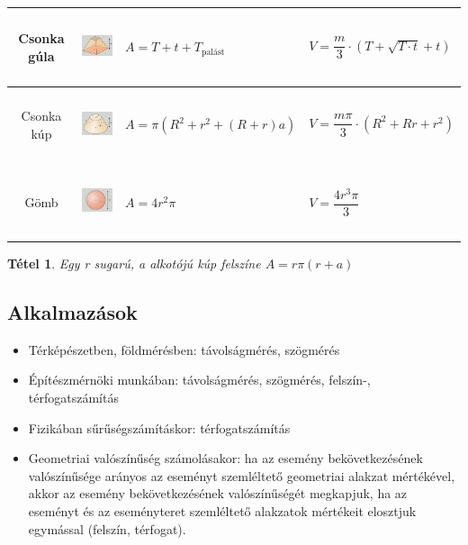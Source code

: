 \documentclass[12pt,a4paper]{article}
\newtheorem{theorem}{Tétel} [section]
\begin{document}
\begin{center}
\begin{tabular}{c|m{4cm}|m{4.5cm}|m{4.5cm}}
Csonka gúla &\centering \includegraphics[height=2cm]{felszin_terfogat_7}&$A=T+t+T_{\text{palást}}$&$V=\dfrac{m}{3}\cdot(T+\sqrt{T\cdot t}+t)$ \\ \hline
Csonka kúp &\centering \includegraphics[height=2cm]{felszin_terfogat_8}&$A=\pi(R^2+r^2+(R+r)a)$&$V=\dfrac{m\pi}{3}\cdot (R^2+Rr+r^2)$ \\ \hline
Gömb &\centering \includegraphics[height=2cm]{felszin_terfogat_9}&$A=4r^2\pi$&$V=\dfrac{4r^3\pi}{3}$ \\ \hline
\end{tabular}
\end{center}

\begin{theorem}
Egy r sugarú, a alkotójú kúp felszíne $A=r\pi(r+a)$
\end{theorem}
\newpage
\subsection{Alkalmazások}
\begin{itemize}
\item Térképészetben, földmérésben: távolságmérés, szögmérés
\item Építészmérnöki munkában: távolságmérés, szögmérés, felszín-, térfogatszámítás
\item Fizikában sűrűségszámításkor: térfogatszámítás
\item Geometriai valószínűség számolásakor: ha az esemény bekövetkezésének valószínűsége
arányos az eseményt szemléltető geometriai alakzat mértékével, akkor az esemény bekövetkezésének valószínűségét megkapjuk, ha az eseményt és az eseményteret szemléltető alakzatok mértékeit elosztjuk egymással (felszín, térfogat).
\end{itemize}
\newpage
\end{document}
